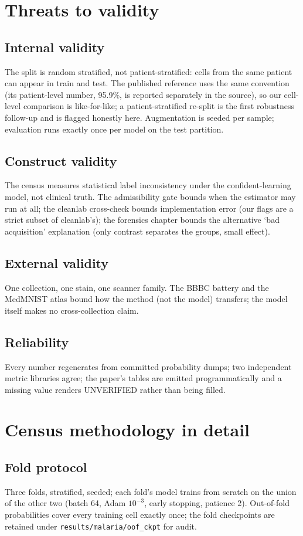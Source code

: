 
\section{Threats to validity}
\subsection{Internal validity}
The split is random stratified, not patient-stratified: cells from the
same patient can appear in train and test. The published reference uses
the same convention (its patient-level number, 95.9\%, is reported
separately in the source), so our cell-level comparison is like-for-like;
a patient-stratified re-split is the first robustness follow-up and is
flagged honestly here. Augmentation is seeded per sample; evaluation runs
exactly once per model on the test partition.
\subsection{Construct validity}
The census measures statistical label inconsistency under the
confident-learning model, not clinical truth. The admissibility gate
bounds when the estimator may run at all; the cleanlab cross-check bounds
implementation error (our flags are a strict subset of cleanlab's); the
forensics chapter bounds the alternative `bad acquisition' explanation
(only contrast separates the groups, small effect).
\subsection{External validity}
One collection, one stain, one scanner family. The BBBC battery and the
MedMNIST atlas bound how the method (not the model) transfers; the model
itself makes no cross-collection claim.
\subsection{Reliability}
Every number regenerates from committed probability dumps; two independent
metric libraries agree; the paper's tables are emitted programmatically
and a missing value renders UNVERIFIED rather than being filled.

\section{Census methodology in detail}
\subsection{Fold protocol}
Three folds, stratified, seeded; each fold's model trains from scratch on
the union of the other two (batch 64, Adam $10^{-3}$, early stopping,
patience 2). Out-of-fold probabilities cover every training cell exactly
once; the fold checkpoints are retained under
\texttt{results/malaria/oof\_ckpt} for audit.
